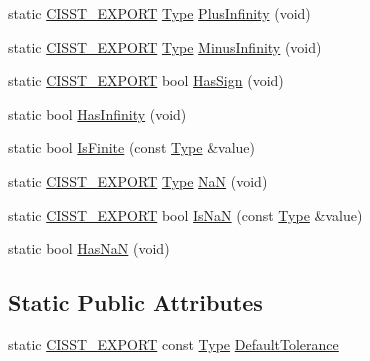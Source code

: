 \begin{DoxyCompactItemize}
\item 
static \hyperlink{cmn_export_macros_8h_a99393e0c3ac434b2605235bbe20684f8}{C\-I\-S\-S\-T\-\_\-\-E\-X\-P\-O\-R\-T} \hyperlink{classcmn_type_traits_aefe66f235207b010b396b5558529a1da}{Type} \hyperlink{classcmn_type_traits_a6424d4282eeee798eecb26a44ab3fec3}{Plus\-Infinity} (void)
\item 
static \hyperlink{cmn_export_macros_8h_a99393e0c3ac434b2605235bbe20684f8}{C\-I\-S\-S\-T\-\_\-\-E\-X\-P\-O\-R\-T} \hyperlink{classcmn_type_traits_aefe66f235207b010b396b5558529a1da}{Type} \hyperlink{classcmn_type_traits_a48fd454b2c1296aa4aa1a69f4833e6fa}{Minus\-Infinity} (void)
\item 
static \hyperlink{cmn_export_macros_8h_a99393e0c3ac434b2605235bbe20684f8}{C\-I\-S\-S\-T\-\_\-\-E\-X\-P\-O\-R\-T} bool \hyperlink{classcmn_type_traits_abb120b3353d432e2d3e00dd8bb478df9}{Has\-Sign} (void)
\item 
static bool \hyperlink{classcmn_type_traits_ace3a699f3986a4daff0116aeb5f2ca8a}{Has\-Infinity} (void)
\item 
static bool \hyperlink{classcmn_type_traits_aa14a8fd2ac2d4d43954001a77261cea9}{Is\-Finite} (const \hyperlink{classcmn_type_traits_aefe66f235207b010b396b5558529a1da}{Type} \&value)
\item 
static \hyperlink{cmn_export_macros_8h_a99393e0c3ac434b2605235bbe20684f8}{C\-I\-S\-S\-T\-\_\-\-E\-X\-P\-O\-R\-T} \hyperlink{classcmn_type_traits_aefe66f235207b010b396b5558529a1da}{Type} \hyperlink{classcmn_type_traits_acfa16ce53e0a6962a9dba4133ce0536f}{Na\-N} (void)
\item 
static \hyperlink{cmn_export_macros_8h_a99393e0c3ac434b2605235bbe20684f8}{C\-I\-S\-S\-T\-\_\-\-E\-X\-P\-O\-R\-T} bool \hyperlink{classcmn_type_traits_a28a75039ed08e387128420f5b18761dd}{Is\-Na\-N} (const \hyperlink{classcmn_type_traits_aefe66f235207b010b396b5558529a1da}{Type} \&value)
\item 
static bool \hyperlink{classcmn_type_traits_a10e7c8086bb949f7911d5f1c26f8ee6f}{Has\-Na\-N} (void)
\end{DoxyCompactItemize}
\subsection*{Static Public Attributes}
\begin{DoxyCompactItemize}
\item 
static \hyperlink{cmn_export_macros_8h_a99393e0c3ac434b2605235bbe20684f8}{C\-I\-S\-S\-T\-\_\-\-E\-X\-P\-O\-R\-T} const \hyperlink{classcmn_type_traits_aefe66f235207b010b396b5558529a1da}{Type} \hyperlink{classcmn_type_traits_ad26b1da1fc0ccccc3b84735dd2a26e35}{Default\-Tolerance}
\end{DoxyCompactItemize}


